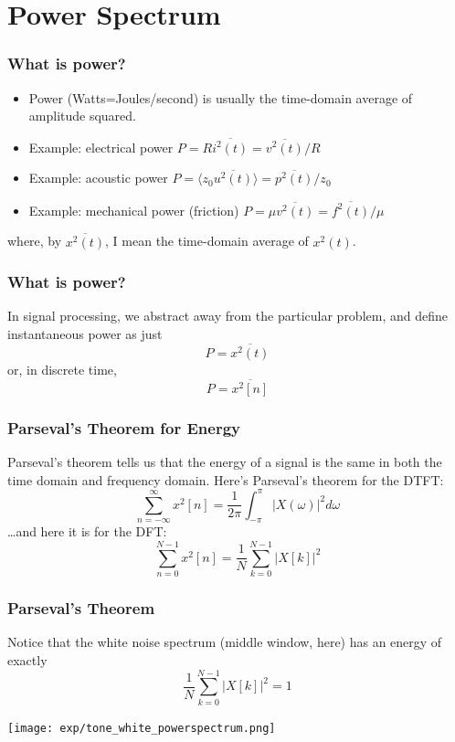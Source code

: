 \documentclass{beamer}
\begin{document}
\section[Power]{Power Spectrum}
\setcounter{subsection}{1}

\begin{frame}
  \frametitle{What is power?}

  \begin{itemize}
    \item Power (Watts=Joules/second) is usually the time-domain
      average of amplitude squared.
    \item Example: electrical power $P=R\overline{i^2(t)} = \overline{v^2(t)}/R$
    \item Example: acoustic power $P=\langle z_0 \overline{u^2(t)}\rangle = \overline{p^2(t)}/z_0$
    \item Example: mechanical power (friction) $P= \mu\overline{v^2(t)} = \overline{f^2(t)}/\mu$
  \end{itemize}
  where, by $\overline{x^2(t)}$, I mean the time-domain average of $x^2(t)$.
\end{frame}

\begin{frame}
  \frametitle{What is power?}

  In signal processing, we abstract away from the particular problem,
  and define instantaneous power as just
  \[
  P = \overline{x^2(t)}
  \]
  or, in  discrete time,
  \[
  P = \overline{x^2[n]}
  \]
\end{frame}
  
\begin{frame}
  \frametitle{Parseval's Theorem for Energy}

  Parseval's theorem tells us that the energy of a signal is the same
  in both the time domain and frequency domain.  Here's Parseval's
  theorem for the DTFT:
  \[
  \sum_{n=-\infty}^{\infty}x^2[n] = \frac{1}{2\pi}\int_{-\pi}^{\pi}\left|X(\omega)\right|^2d\omega
  \]
  \ldots and here it is for the DFT:
  \[
  \sum_{n=0}^{N-1}x^2[n] = \frac{1}{N}\sum_{k=0}^{N-1}\left|X[k]\right|^2
  \]  
\end{frame}

\begin{frame}
  \frametitle{Parseval's Theorem}

  Notice that the white noise spectrum (middle window, here) has an energy of exactly
  \[
  \frac{1}{N}\sum_{k=0}^{N-1}\left|X[k]\right|^2 = 1
  \]
  
  \centerline{\texttt{[image: exp/tone\_white\_powerspectrum.png]}}
\end{frame}
\end{document}
